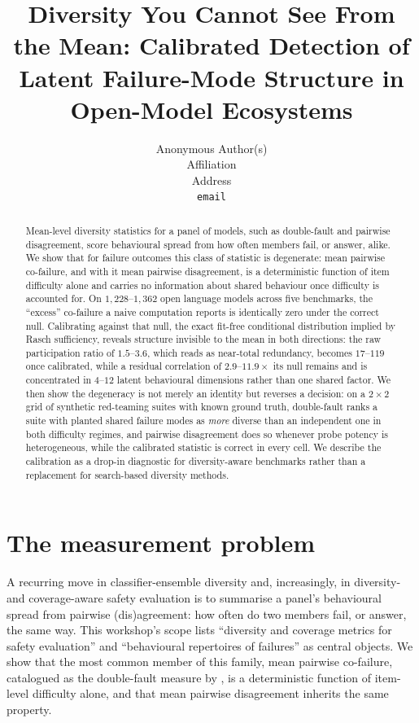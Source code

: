 \documentclass{article}
\title{Diversity You Cannot See From the Mean: Calibrated Detection of Latent Failure-Mode Structure in Open-Model Ecosystems}
\author{
  Anonymous Author(s) \\
  Affiliation \\
  Address \\
  \texttt{email}
}
\begin{document}
\maketitle

\begin{abstract}
Mean-level diversity statistics for a panel of models, such as double-fault and pairwise
disagreement, score behavioural spread from how often members fail, or answer, alike. We show that
for failure outcomes this class of statistic is degenerate: mean pairwise co-failure, and with it
mean pairwise disagreement, is a deterministic function of item difficulty alone and carries no
information about shared behaviour once difficulty is accounted for. On $1{,}228$--$1{,}362$ open
language models across five benchmarks, the ``excess'' co-failure a naive computation reports is
identically zero under the correct null. Calibrating against that null, the exact fit-free
conditional distribution implied by Rasch sufficiency, reveals structure invisible to the mean in
both directions: the raw participation ratio of $1.5$--$3.6$, which reads as near-total
redundancy, becomes $17$--$119$ once calibrated, while a residual correlation of
$2.9$--$11.9\times$ its null remains and is concentrated in $4$--$12$ latent behavioural dimensions
rather than one shared factor. We then show the degeneracy is not merely an identity but reverses a decision:
on a $2\times2$ grid of synthetic red-teaming suites with known ground truth, double-fault ranks a
suite with planted shared failure modes as \emph{more} diverse than an independent one in both
difficulty regimes, and pairwise disagreement does so whenever probe potency is heterogeneous,
while the calibrated statistic is correct in every cell. We describe the calibration as a drop-in
diagnostic for diversity-aware benchmarks rather than a replacement for search-based diversity
methods.
\end{abstract}

\section{The measurement problem}

A recurring move in classifier-ensemble diversity and, increasingly, in diversity- and
coverage-aware safety evaluation is to summarise a panel's behavioural spread from pairwise
(dis)agreement: how often do two members fail, or answer, the same way. This workshop's scope lists
``diversity and coverage metrics for safety evaluation'' and ``behavioural repertoires of
failures'' as central objects. We show that the most common member of this family, mean pairwise
co-failure, catalogued as the double-fault measure by \citet{kuncheva2003}, is a deterministic
function of item-level difficulty alone, and that mean pairwise disagreement inherits the same
property.
\end{document}
